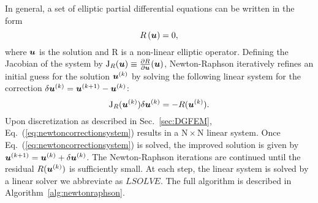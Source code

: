 In general, a set of elliptic partial differential equations can be written in the form
%
\begin{equation}\label{eq:Ru=0}
  R\left(\boldsymbol{u} \right) = 0,
\end{equation}
%
where $\boldsymbol{u}$ is the solution and R is a non-linear elliptic operator.
Defining the Jacobian of the system by
%
$\mathrm{J}_{R}(\boldsymbol{u}) \equiv \frac{\partial R}{\partial \boldsymbol{u}}(\boldsymbol{u})$,
%
Newton-Raphson iteratively refines an initial guess for the solution
$\boldsymbol{u}^{(k)}$ by solving the following 
linear system for the correction $\delta \boldsymbol{u}^{(k)} = \boldsymbol{u}^{(k+1)} -
\boldsymbol{u}^{(k)}$:
%
\begin{equation}
\label{eq:newtoncorrectionsystem}
\mathrm{J}_R(\boldsymbol{u}^{(k)})\delta \boldsymbol{u}^{(k)} = -R(\boldsymbol{u}^{(k)}).
\end{equation}
%
Upon discretization as described in Sec.~\ref{sec:DGFEM}, Eq.~(\ref{eq:newtoncorrectionsystem}) results in
  a $\mathrm{N} \times \mathrm{N}$ linear system.
Once Eq.~(\ref{eq:newtoncorrectionsystem}) is solved, the improved solution is given by $\boldsymbol{u}^{(k+1)}=\boldsymbol{u}^{(k)}+\delta \boldsymbol{u}^{(k)}$.
  The Newton-Raphson iterations are continued until the residual $R(\boldsymbol{u}^{(k)})$ is sufficiently small. At each step, the linear system is solved by a linear solver we abbreviate as $LSOLVE$. The full algorithm is described in Algorithm~\ref{alg:newtonraphson}.


